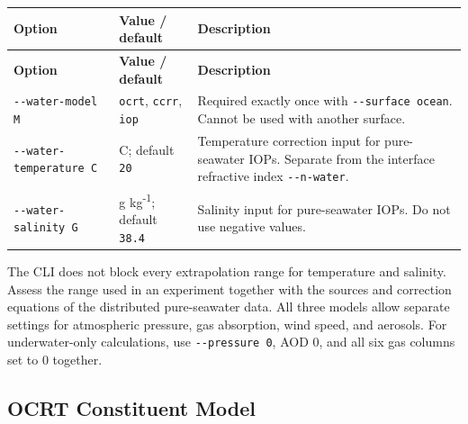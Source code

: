 {\TableFont
\begin{longtable}{@{}>{\raggedright\arraybackslash}p{}>{\raggedright\arraybackslash}p{}>{\raggedright\arraybackslash}p{}@{}}
\toprule
\textbf{Option} & \textbf{Value / default} & \textbf{Description} \\
\midrule
\endfirsthead
\toprule
\textbf{Option} & \textbf{Value / default} & \textbf{Description} \\
\midrule
\endhead
\bottomrule
\endfoot
\texttt{-\allowbreak{}-\allowbreak{}water-\allowbreak{}model M} & \texttt{ocrt}, \texttt{ccrr}, \texttt{iop} & Required exactly once with \texttt{-\allowbreak{}-\allowbreak{}surface ocean}. Cannot be used with another surface. \\
\texttt{-\allowbreak{}-\allowbreak{}water-\allowbreak{}temperature C} & \textdegree{}C; default \texttt{20} & Temperature correction input for pure-seawater IOPs. Separate from the interface refractive index \texttt{-\allowbreak{}-\allowbreak{}n-\allowbreak{}water}. \\
\texttt{-\allowbreak{}-\allowbreak{}water-\allowbreak{}salinity G} & g kg\textsuperscript{-}\textsuperscript{1}; default \texttt{38.\allowbreak{}4} & Salinity input for pure-seawater IOPs. Do not use negative values. \\
\end{longtable}
}

The CLI does not block every extrapolation range for temperature and salinity. Assess the range used in an experiment together with the sources and correction equations of the distributed pure-seawater data. All three models allow separate settings for atmospheric pressure, gas absorption, wind speed, and aerosols. For underwater-only calculations, use \texttt{-\allowbreak{}-\allowbreak{}pressure 0}, AOD 0, and all six gas columns set to 0 together.

\subsection{OCRT Constituent Model}
\label{sec:auto:03_options:5.1}

